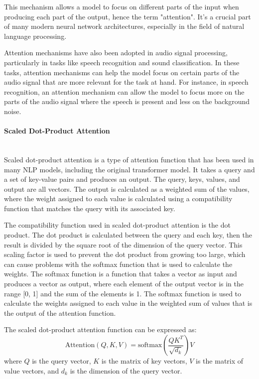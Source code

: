 This mechanism allows a model to focus on different parts of the input when producing each part of the output, hence the term "attention". It's a crucial part of many modern neural network architectures, especially in the field of natural language processing.

Attention mechanisms have also been adopted in audio signal processing, particularly in tasks like speech recognition and sound classification. In these tasks, attention mechanisms can help the model focus on certain parts of the audio signal that are more relevant for the task at hand. For instance, in speech recognition, an attention mechanism can allow the model to focus more on the parts of the audio signal where the speech is present and less on the background noise.

\paragraph{Scaled Dot-Product Attention}\mbox{}\\
Scaled dot-product attention is a type of attention function that has been used in many NLP models, including the original transformer model. It takes a query and a set of key-value pairs and produces an output. The query, keys, values, and output are all vectors. The output is calculated as a weighted sum of the values, where the weight assigned to each value is calculated using a compatibility function that matches the query with its associated key.

The compatibility function used in scaled dot-product attention is the dot product. The dot product is calculated between the query and each key, then the result is divided by the square root of the dimension of the query vector. This scaling factor is used to prevent the dot product from growing too large, which can cause problems with the softmax function that is used to calculate the weights. The softmax function is a function that takes a vector as input and produces a vector as output, where each element of the output vector is in the range [0, 1] and the sum of the elements is 1. The softmax function is used to calculate the weights assigned to each value in the weighted sum of values that is the output of the attention function.

The scaled dot-product attention function can be expressed as:
\begin{equation} \label{eq:dot-product-attention}
    \text{Attention}(Q, K, V) = \text{softmax}(\frac{QK^T}{\sqrt{d_k}})V
\end{equation}
where $Q$ is the query vector, $K$ is the matrix of key vectors, $V$ is the matrix of value vectors, and $d_k$ is the dimension of the query vector.

